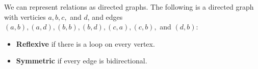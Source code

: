 \documentclass[article, 12pt]{article}
\theoremstyle{definition}
\begin{document}
    We can represent relations as directed graphs. The following is a directed graph with verticies $a, b, c,$ and $d$, and edges $(a,b), (a,d), (b,b), (b,d), (c,a), (c,b),$ and $(d,b)$:
    \begin{figure}[H]
        \centering
    \end{figure}
    \begin{itemize}
        \item \textbf{Reflexive} if there is a loop on every vertex. 
        \item \textbf{Symmetric} if every edge is bidirectional.
    \end{itemize}
        
\end{document}

